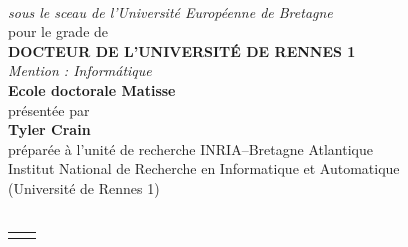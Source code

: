 \begin{titlepage}
\begin{center}
\begin{minipage}{\glarg}
\vspace{0.5cm}
\\ \vspace{0mm}\emph{\Large sous le sceau de l'Universit\'e Europ\'eenne de Bretagne}\\ \vspace{0.5cm}
{\Large pour le grade de}\\ \vspace{2mm}
{\Large\bf DOCTEUR DE L'UNIVERSIT\'E DE RENNES 1}\\ \vspace{0.4cm}
\emph{\Large Mention : Inform{\'a}tique}\\ \vspace{2mm}
{\Large\bf Ecole doctorale Matisse}\\ \vspace{0.3cm}
{\Large pr\'esent\'ee par} \\ \vspace{3mm}
{\Huge\bf Tyler Crain}\\ \vspace{0.4cm}
{\Large pr\'epar\'ee \`a l'unit\'e de recherche INRIA--Bretagne Atlantique\\
Institut National de Recherche en Informatique et Automatique \\
(Universit\'{e} de Rennes 1)}\vspace{0.3cm}
\\
\hspace{-20mm}{\rule{\Glarg}{1pt}}\\
\vspace{8mm}

\begin{tabular}{p{7cm}p{10cm}}
\begin{minipage}{\plarg}

\hspace{-1.8cm}{\huge\bf On Improving the}\vspace{5mm}

\hspace{-1.8cm}{\huge\bf  Ease of Use of the}\vspace{5mm}


\end{minipage}
\end{tabular}
\end{minipage}
\end{center}
\end{titlepage}
